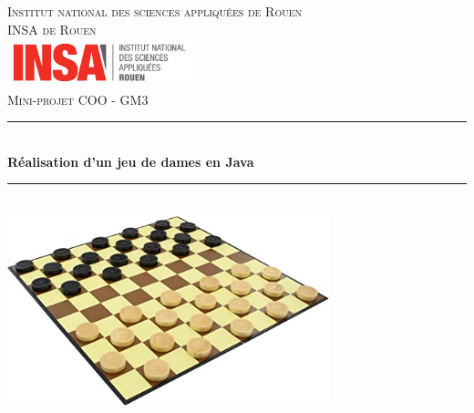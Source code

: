 \documentclass[12,french]{report}
\newcommand{\HRule}{\rule{\linewidth}{0.5mm}}
\begin{document}
\hypersetup{pdfborder=0 0 0}

\begin{titlepage}

\begin{center}
	\textsc{{\LARGE Institut national des sciences appliquées de Rouen} \\ 			\vspace{6mm} {\Large INSA de Rouen}} \\
	\vspace{5mm}
	\includegraphics[width=0.4\textwidth]{./Images/insa}\\[1.0 cm]

	\textsc{\Large Mini-projet COO - GM3}\\[0.6cm]

	\HRule \\[0.5cm]
	{ \Huge \bfseries Réalisation d'un jeu de dames en Java}\\[0.2cm]
	\HRule \\[0.75cm]

	\includegraphics[width=0.7\textwidth]{./Images/Page_de_garde}\\[0.9 cm]


\end{center}
\end{titlepage}
\end{document}
